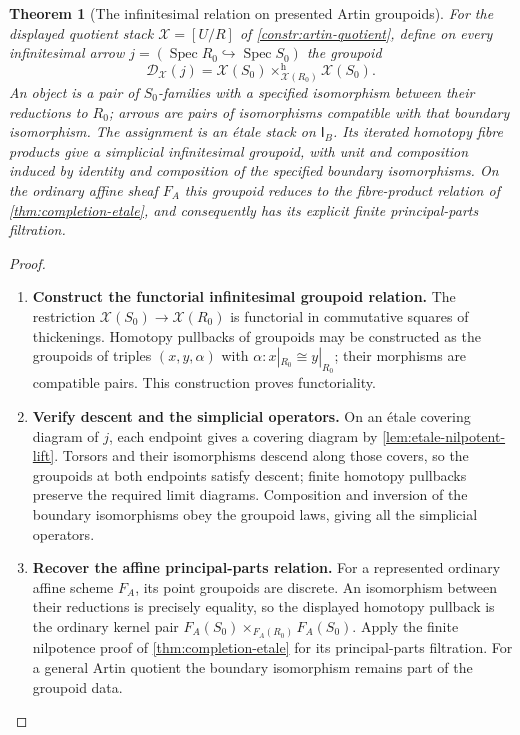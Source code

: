 \documentclass[11pt,a4paper]{article}
\numberwithin{algorithm}{section}
\numberwithin{equation}{section}
\newtheorem{theorem}{Theorem}[section]
\theoremstyle{definition}
\theoremstyle{remark}
\theoremstyle{plain}
\newcommand{\InfB}{\mathsf I_B}
\theoremstyle{definition}
\theoremstyle{plain}
\begin{document}
\begin{theorem}[The infinitesimal relation on presented Artin groupoids]
\label{thm:artin-stacky-formal-relation}
For the displayed quotient stack $\mathcal X=[U/R]$ of
\cref{constr:artin-quotient}, define on every infinitesimal
arrow $j=(\operatorname{Spec}R_0\hookrightarrow\operatorname{Spec}S_0)$
the groupoid
\[
 \mathcal D_{\mathcal X}(j)
 =\mathcal X(S_0)
   \mathop{\times}^{\mathrm{h}}_{\mathcal X(R_0)}
   \mathcal X(S_0).
\]
An object is a pair of $S_0$-families with a specified
isomorphism between their reductions to $R_0$; arrows are
pairs of isomorphisms compatible with that boundary
isomorphism.  The assignment is an \'etale stack on
$\InfB$.  Its iterated homotopy fibre products give a
simplicial infinitesimal groupoid, with unit and composition
induced by identity and composition of the specified
boundary isomorphisms.  On the ordinary affine sheaf
$F_A$ this groupoid reduces to the fibre-product
relation of \cref{thm:completion-etale}, and consequently
has its explicit finite principal-parts filtration.
\end{theorem}
\begin{proof}\leavevmode
\begin{enumerate}[leftmargin=*,align=left]
\item \textbf{Construct the functorial infinitesimal groupoid relation.}
The restriction $\mathcal X(S_0)\to\mathcal X(R_0)$
is functorial in commutative squares of thickenings.
Homotopy pullbacks of groupoids may be constructed as
the groupoids of triples $(x,y,\alpha)$ with
$\alpha:x|_{R_0}\cong y|_{R_0}$; their morphisms are
compatible pairs.  This construction proves functoriality.

\item \textbf{Verify descent and the simplicial operators.}
On an \'etale covering diagram of $j$, each
endpoint gives a covering diagram by
\cref{lem:etale-nilpotent-lift}.  Torsors and their
isomorphisms descend along those covers, so the groupoids
at both endpoints satisfy descent; finite homotopy pullbacks
preserve the required limit diagrams.  Composition and
inversion of the boundary isomorphisms obey the groupoid
laws, giving all the simplicial operators.

\item \textbf{Recover the affine principal-parts relation.}
For a represented ordinary affine scheme $F_A$, its point
groupoids are discrete.  An isomorphism between their
reductions is precisely equality, so the displayed
homotopy pullback is the ordinary kernel pair
$F_A(S_0)\times_{F_A(R_0)}F_A(S_0)$.  Apply the finite
nilpotence proof of \cref{thm:completion-etale} for its
principal-parts filtration.  For a general Artin quotient the boundary isomorphism remains part of the groupoid data.
\end{enumerate}
\end{proof}
\end{document}
